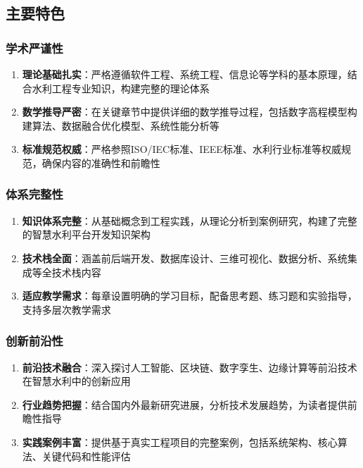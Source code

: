 \documentclass[12pt,a4paper]{ctexart}
\begin{document}
\subsection{主要特色}\label{ux4e3bux8981ux7279ux8272}

\subsubsection{学术严谨性}\label{ux5b66ux672fux4e25ux8c28ux6027}

\begin{enumerate}
\def\labelenumi{\arabic{enumi}.}
\item
  \textbf{理论基础扎实}：严格遵循软件工程、系统工程、信息论等学科的基本原理，结合水利工程专业知识，构建完整的理论体系
\item
  \textbf{数学推导严密}：在关键章节中提供详细的数学推导过程，包括数字高程模型构建算法、数据融合优化模型、系统性能分析等
\item
  \textbf{标准规范权威}：严格参照ISO/IEC标准、IEEE标准、水利行业标准等权威规范，确保内容的准确性和前瞻性
\end{enumerate}

\subsubsection{体系完整性}\label{ux4f53ux7cfbux5b8cux6574ux6027}

\begin{enumerate}
\def\labelenumi{\arabic{enumi}.}
\setcounter{enumi}{3}
\item
  \textbf{知识体系完整}：从基础概念到工程实践，从理论分析到案例研究，构建了完整的智慧水利平台开发知识架构
\item
  \textbf{技术栈全面}：涵盖前后端开发、数据库设计、三维可视化、数据分析、系统集成等全技术栈内容
\item
  \textbf{适应教学需求}：每章设置明确的学习目标，配备思考题、练习题和实验指导，支持多层次教学需求
\end{enumerate}

\subsubsection{创新前沿性}\label{ux521bux65b0ux524dux6cbfux6027}

\begin{enumerate}
\def\labelenumi{\arabic{enumi}.}
\setcounter{enumi}{6}
\item
  \textbf{前沿技术融合}：深入探讨人工智能、区块链、数字孪生、边缘计算等前沿技术在智慧水利中的创新应用
\item
  \textbf{行业趋势把握}：结合国内外最新研究进展，分析技术发展趋势，为读者提供前瞻性指导
\item
  \textbf{实践案例丰富}：提供基于真实工程项目的完整案例，包括系统架构、核心算法、关键代码和性能评估
\end{enumerate}
\end{document}
